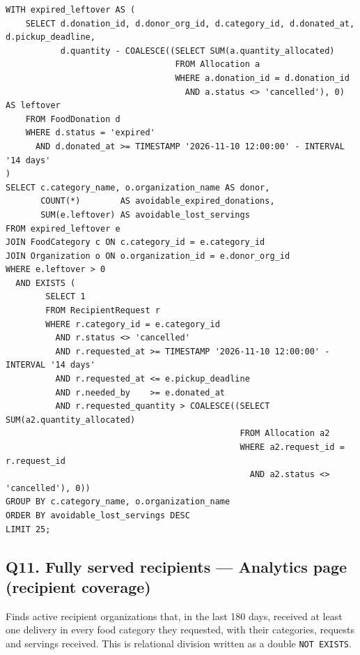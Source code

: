 \documentclass[11pt,letterpaper]{article}
\begin{document}
\begin{lstlisting}
WITH expired_leftover AS (
    SELECT d.donation_id, d.donor_org_id, d.category_id, d.donated_at, d.pickup_deadline,
           d.quantity - COALESCE((SELECT SUM(a.quantity_allocated)
                                  FROM Allocation a
                                  WHERE a.donation_id = d.donation_id
                                    AND a.status <> 'cancelled'), 0) AS leftover
    FROM FoodDonation d
    WHERE d.status = 'expired'
      AND d.donated_at >= TIMESTAMP '2026-11-10 12:00:00' - INTERVAL '14 days'
)
SELECT c.category_name, o.organization_name AS donor,
       COUNT(*)        AS avoidable_expired_donations,
       SUM(e.leftover) AS avoidable_lost_servings
FROM expired_leftover e
JOIN FoodCategory c ON c.category_id = e.category_id
JOIN Organization o ON o.organization_id = e.donor_org_id
WHERE e.leftover > 0
  AND EXISTS (
        SELECT 1
        FROM RecipientRequest r
        WHERE r.category_id = e.category_id
          AND r.status <> 'cancelled'
          AND r.requested_at >= TIMESTAMP '2026-11-10 12:00:00' - INTERVAL '14 days'
          AND r.requested_at <= e.pickup_deadline
          AND r.needed_by    >= e.donated_at
          AND r.requested_quantity > COALESCE((SELECT SUM(a2.quantity_allocated)
                                               FROM Allocation a2
                                               WHERE a2.request_id = r.request_id
                                                 AND a2.status <> 'cancelled'), 0))
GROUP BY c.category_name, o.organization_name
ORDER BY avoidable_lost_servings DESC
LIMIT 25;
\end{lstlisting}

\subsection*{Q11. Fully served recipients --- Analytics page (recipient coverage)}
Finds active recipient organizations that, in the last 180 days, received at least one delivery in every food category they requested, with their categories, requests and servings received. This is relational division written as a double \texttt{NOT EXISTS}.
\end{document}
